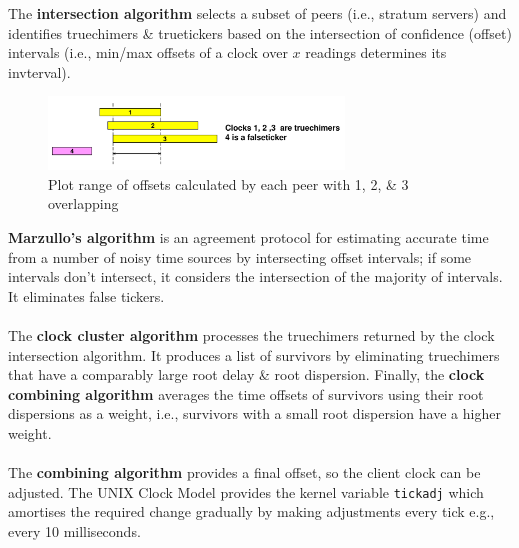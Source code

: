 \documentclass[a4paper,11pt]{article}
\begin{document}
The \textbf{intersection algorithm} selects a subset of peers (i.e., stratum servers) and identifies truechimers \& truetickers based on the intersection of confidence (offset) intervals (i.e., min/max offsets of a clock over $x$ readings determines its invterval).

\begin{figure}[H]
    \centering
    \includegraphics[width=0.7\textwidth]{./images/intersectional.png}
    \caption{ Plot range of offsets calculated by each peer with 1, 2, \& 3 overlapping}
\end{figure}

\textbf{Marzullo's algorithm} is an agreement protocol for estimating accurate time from a number of noisy time sources by intersecting offset intervals; if some intervals don't intersect, it considers the intersection of the majority of intervals.
It eliminates false tickers.
\\\\
The \textbf{clock cluster algorithm} processes the truechimers returned by the clock intersection algorithm.
It produces a list of survivors by eliminating truechimers that have a comparably large root delay \& root dispersion.
Finally, the \textbf{clock combining algorithm} averages the time offsets of survivors using their root dispersions as a weight, i.e., survivors with a small root dispersion have a higher weight.
\\\\
The \textbf{combining algorithm} provides a final offset, so the client clock can be adjusted.
The UNIX Clock Model provides the kernel variable \verb|tickadj| which amortises the required change gradually by making adjustments every tick e.g., every 10 milliseconds.
\end{document}
